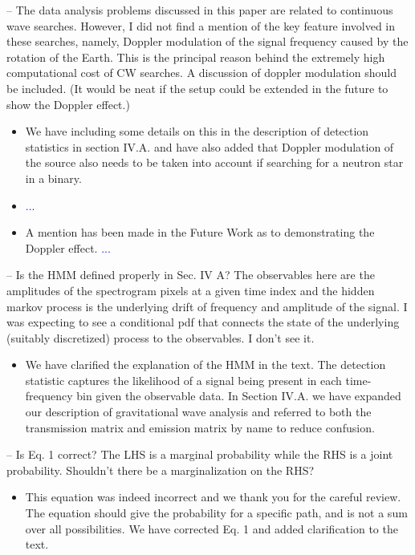 \documentclass{article}
\newcommand{\todo}{\textcolor{blue}}
\begin{document}
\noindent 
-- The data analysis problems discussed in this paper are related to continuous wave searches. However, I did not find a mention of the key feature involved in these searches, namely, Doppler modulation of the signal frequency caused by the rotation of the Earth. This is the principal reason behind the extremely high computational cost of CW searches. A discussion of doppler modulation should be included. (It would be neat if the setup could be extended in the future to show the Doppler effect.)
\begin{itemize}
\item We have including some details on this in the description of detection statistics in section IV.A. and have also added that Doppler modulation of the source also needs to be taken into account if searching for a neutron star in a binary. 
\item \todo{...}
\item A mention has been made in the Future Work as to demonstrating the Doppler effect.
 \todo{...}
\end{itemize}

\noindent
-- Is the HMM defined properly in Sec. IV A? The observables here are the amplitudes of the spectrogram pixels at a given time index and the hidden markov process is the underlying drift of frequency and amplitude of the signal. I was expecting to see a conditional pdf that connects the state of the underlying (suitably discretized) process to the observables. I don't see it.
\begin{itemize}
\item We have clarified the explanation of the HMM in the text. The detection statistic captures the likelihood of a signal being present in each time-frequency bin given the observable data. In Section IV.A. we have expanded our description of gravitational wave analysis and referred to both the transmission matrix and emission matrix by name to reduce confusion. 
\end{itemize}

\noindent
-- Is Eq. 1 correct? The LHS is a marginal probability while the RHS is a joint probability. Shouldn't there be a marginalization on the RHS?
\begin{itemize}
\item This equation was indeed incorrect and we thank you for the careful review. The equation should give the probability for a specific path, and is not a sum over all possibilities. We have corrected Eq. 1 and added clarification to the text. 
\end{itemize}
\end{document}
